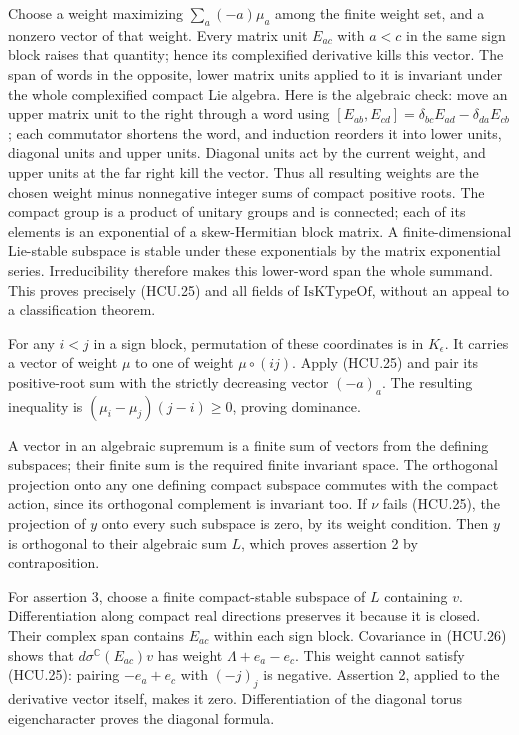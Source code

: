 Choose a weight maximizing \(\sum_a(-a)\mu_a\) among the finite weight
set, and a nonzero vector of that weight.  Every matrix unit \(E_{ac}\)
with \(a<c\) in the same sign block raises that quantity; hence its
complexified derivative kills this vector.
The span of words in the opposite, lower matrix units applied to it
is invariant under the whole complexified compact Lie algebra.
Here is the algebraic check: move an upper matrix unit to the right
through a word using
\([E_{ab},E_{cd}]=\delta_{bc}E_{ad}-\delta_{da}E_{cb}\);
each commutator shortens the word, and induction reorders it into
lower units, diagonal units and upper units.  Diagonal units act by
the current weight, and upper units at the far right kill the vector.
Thus all resulting weights are the chosen weight minus nonnegative
integer sums of compact positive roots.
The compact group is a product of unitary groups and is connected;
each of its elements is an exponential of a skew-Hermitian block
matrix.  A finite-dimensional Lie-stable subspace is stable under
these exponentials by the matrix exponential series.  Irreducibility
therefore makes this lower-word span the whole summand.
This proves precisely (HCU.25) and all fields of
\(\mathrm{IsKTypeOf}\), without an appeal to a classification theorem.

For any \(i<j\) in a sign block, permutation of these coordinates is
in \(K_\epsilon\).  It carries a vector of weight \(\mu\) to one of
weight \(\mu\circ(ij)\).
Apply (HCU.25) and pair its positive-root sum with the strictly
decreasing vector \((-a)_a\).  The resulting inequality is
\((\mu_i-\mu_j)(j-i)\ge0\), proving dominance.

A vector in an algebraic supremum is a finite sum of vectors from the
defining subspaces; their finite sum is the required finite invariant
space.  The orthogonal projection onto any one defining compact
subspace commutes with the compact action, since its orthogonal
complement is invariant too.  If \(\nu\) fails (HCU.25), the projection
of \(y\) onto every such subspace is zero, by its weight condition.
Then \(y\) is orthogonal to their algebraic sum \(L\), which proves
assertion 2 by contraposition.

For assertion 3, choose a finite compact-stable subspace of \(L\)
containing \(v\).  Differentiation along compact real directions
preserves it because it is closed.  Their complex span contains
\(E_{ac}\) within each sign block.  Covariance in (HCU.26) shows that
\(d\sigma^{\mathbb C}(E_{ac})v\) has weight
\(\Lambda+e_a-e_c\).  This weight cannot satisfy (HCU.25): pairing
\(-e_a+e_c\) with \((-j)_j\) is negative.  Assertion 2, applied to
the derivative vector itself, makes it zero.  Differentiation of the
diagonal torus eigencharacter proves the diagonal formula.

